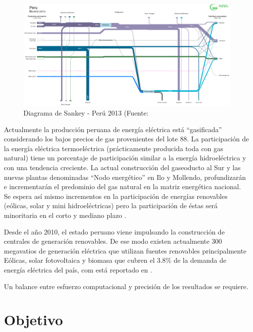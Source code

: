\begin{figure} [h!]
\centering
\includegraphics[width=0.80\linewidth]{imagenes/sankey_peru_2013}
\caption[Diagrama de Sankey - Perú 2013]{Diagrama de Sankey - Perú 2013 (Fuente:\citep{iea_iea_2016} }
\label{fig:sankeyperu2013}
\end{figure}

Actualmente la producción peruana de energía eléctrica está “gasificada” considerando los bajos precios de gas provenientes  del lote 88. La participación de la energía eléctrica termoeléctrica (prácticamente producida toda con gas natural) tiene un porcentaje de participación similar a la energía hidroeléctrica y con una tendencia creciente. 
La actual construcción del gaseoducto al Sur y las nuevas plantas denominadas “Nodo energético” en Ilo y Mollendo, profundizarán e incrementarán el predominio del gas natural en la matriz energética nacional. Se espera así mismo incrementos en la participación de energías renovables (eólicas, solar y mini hidroeléctricas) pero  la participación de éstas  será minoritaria en el corto y mediano plazo \citep{coes_memoria_2016}.

Desde el año 2010, el estado peruano viene impulsando la construcción de centrales de generación renovables. De ese modo existen actualmente 300 megavatios de generación eléctrica que utilizan fuentes renovables principalmente Eólicas, solar fotovoltaica y biomasa que cubren el 3.8\% de la demanda de energía eléctrica del país, com está reportado en \citep{coes_memoria_2016}.


\hspace*{1em} Un balance entre esfuerzo computacional y precisión de los resultados se requiere.


\section{Objetivo}

